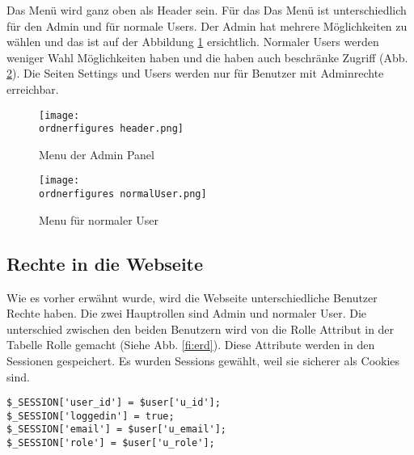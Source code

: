 Das Menü wird ganz oben als Header sein. Für das Das Menü ist unterschiedlich für den Admin und für normale Users. Der Admin hat mehrere Möglichkeiten zu wählen und das ist auf der Abbildung \ref{fi:menu} ersichtlich. Normaler Users werden weniger Wahl Möglichkeiten haben und die haben auch beschränke Zugriff (Abb. \ref{fi:normalerUser}). Die Seiten Settings und Users werden nur für Benutzer mit Adminrechte erreichbar.

\begin{figure}[H]
	\centering
	\texttt{[image: \\ordnerfigures header.png]}
	\caption{Menu der Admin Panel}
	\label{fi:menu}
\end{figure}

\begin{figure}[H]
	\centering
	\texttt{[image: \\ordnerfigures normalUser.png]}
	\caption{Menu für normaler User}
	\label{fi:normalerUser}
\end{figure}





\subsection{Rechte in die Webseite}
Wie es vorher erwähnt wurde, wird die Webseite unterschiedliche Benutzer Rechte haben. Die zwei Hauptrollen sind Admin und normaler User. Die unterschied zwischen den beiden Benutzern wird von die Rolle Attribut in der Tabelle Rolle gemacht (Siehe Abb. \ref{fi:erd}). Diese Attribute werden in den Sessionen gespeichert. Es wurden Sessions gewählt, weil sie sicherer als Cookies sind.\cite{40_sessions_cookies}

\begin{lstlisting}[frame=single]
$_SESSION['user_id'] = $user['u_id'];
$_SESSION['loggedin'] = true;
$_SESSION['email'] = $user['u_email'];
$_SESSION['role'] = $user['u_role'];
\end{lstlisting}


